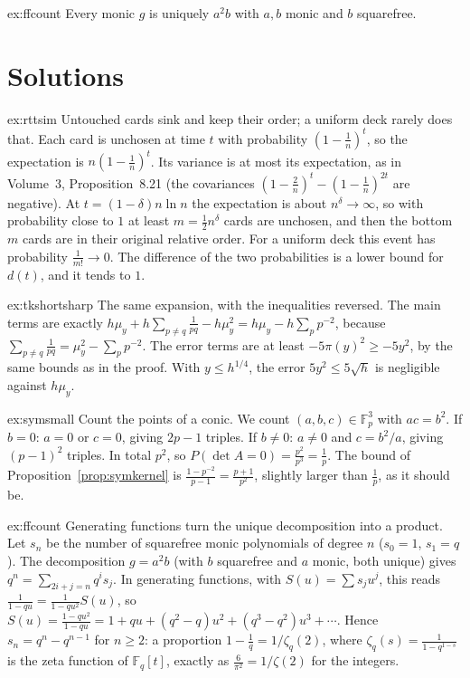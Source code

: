 \begin{hint}{ex:ffcount}
Every monic $g$ is uniquely $a^2b$ with $a,b$ monic and $b$ squarefree.
\end{hint}

\section{Solutions}

\begin{solution}{ex:rttsim}
\idea Untouched cards sink and keep their order; a uniform deck rarely does that.
\writeup Each card is unchosen at time $t$ with probability $(1-\frac1n)^t$, so the expectation is $n(1-\frac1n)^t$. Its variance is at most its expectation, as in Volume~3, Proposition~8.21 (the covariances $(1-\frac2n)^t-(1-\frac1n)^{2t}$ are negative). At $t=(1-\delta)n\ln n$ the expectation is about $n^\delta\to\infty$, so with probability close to $1$ at least $m=\frac12n^{\delta}$ cards are unchosen, and then the bottom $m$ cards are in their original relative order. For a uniform deck this event has probability $\frac1{m!}\to0$. The difference of the two probabilities is a lower bound for $d(t)$, and it tends to $1$.
\end{solution}

\begin{solution}{ex:tkshortsharp}
\idea The same expansion, with the inequalities reversed.
\writeup The main terms are exactly $h\mu_y+h\sum_{p\ne q}\frac1{pq}-h\mu_y^2=h\mu_y-h\sum_pp^{-2}$, because $\sum_{p\ne q}\frac1{pq}=\mu_y^2-\sum_pp^{-2}$. The error terms are at least $-5\pi(y)^2\ge-5y^2$, by the same bounds as in the proof. With $y\le h^{1/4}$, the error $5y^2\le5\sqrt h$ is negligible against $h\mu_y$.
\end{solution}

\begin{solution}{ex:symsmall}
\idea Count the points of a conic.
\writeup We count $(a,b,c)\in\mathbb F_p^3$ with $ac=b^2$. If $b=0$: $a=0$ or $c=0$, giving $2p-1$ triples. If $b\ne0$: $a\ne0$ and $c=b^2/a$, giving $(p-1)^2$ triples. In total $p^2$, so $P(\det A=0)=\frac{p^2}{p^3}=\frac1p$. The bound of Proposition~\ref{prop:symkernel} is $\frac{1-p^{-2}}{p-1}=\frac{p+1}{p^2}$, slightly larger than $\frac1p$, as it should be.
\end{solution}

\begin{solution}{ex:ffcount}
\idea Generating functions turn the unique decomposition into a product.
\writeup Let $s_n$ be the number of squarefree monic polynomials of degree $n$ ($s_0=1$, $s_1=q$). The decomposition $g=a^2b$ (with $b$ squarefree and $a$ monic, both unique) gives $q^n=\sum_{2i+j=n}q^is_j$. In generating functions, with $S(u)=\sum s_ju^j$, this reads $\frac1{1-qu}=\frac1{1-qu^2}S(u)$, so $S(u)=\frac{1-qu^2}{1-qu}=1+qu+(q^2-q)u^2+(q^3-q^2)u^3+\cdots$. Hence $s_n=q^n-q^{n-1}$ for $n\ge2$: a proportion $1-\frac1q=1/\zeta_q(2)$, where $\zeta_q(s)=\frac1{1-q^{1-s}}$ is the zeta function of $\mathbb F_q[t]$, exactly as $\frac6{\pi^2}=1/\zeta(2)$ for the integers.
\end{solution}

